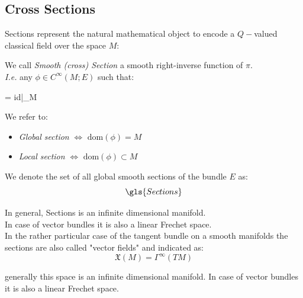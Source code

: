 \documentclass[Main]{subfiles}
\begin{document}
		\subsection{Cross Sections}
			Sections represent the natural mathematical object to encode a $Q-$valued classical field over the space $M$:
			\begin{definition}
				We call \emph{Smooth (cross) Section} a smooth right-inverse function of $\pi$.\\
				\textit{I.e.} any $\phi\in C^\infty(M;E)$ such that:
				\begin{compactdisplaymath}
					\pi\circ\phi = id|_M
				\end{compactdisplaymath}
			\end{definition}
				We refer to:
					\begin{itemize}
						\item \emph{Global section} $\Leftrightarrow$ $\textrm{dom}(\phi) = M$
						\item \emph{Local section} $\Leftrightarrow$ $\textrm{dom}(\phi) \subset M$
					\end{itemize}
				We denote the set of all global smooth sections of the bundle $E$  as:
				\begin{displaymath}
					\gls{Sections}
				\end{displaymath}
\ifToninus
		\begin{observation}
			In general, \gls{Sections} is an infinite dimensional manifold.
			\\
				In case of vector bundles it is also a linear Frechet space\cite{Kriegl}.
			\\
			In the rather particular case of the tangent bundle on a smooth manifolds the sections are also called "vector fields" and indicated as:
			\begin{displaymath}
				\mathfrak{X}(M) = \Gamma^\infty(TM)
			\end{displaymath}
		\end{observation}
\else
			generally this space is an infinite dimensional manifold.
			In case of vector bundles it is also a linear Frechet space\cite{Kriegl}.
\fi
\end{document}
